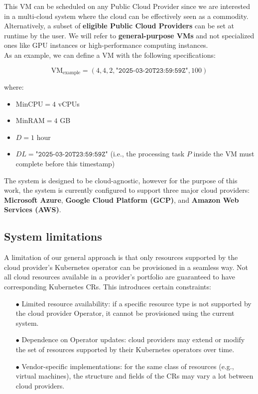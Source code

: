 This VM can be scheduled on any Public Cloud Provider since we are interested in a multi-cloud system where the cloud can be effectively seen as a commodity. 
Alternatively, a subset of \textbf{eligible Public Cloud Providers} can be set at runtime by the user.
We will refer to \textbf{general-purpose VMs} and not specialized ones like GPU instances or high-performance computing instances. \\

As an example, we can define a VM with the following specifications:

\[
\text{VM}_{\text{example}} = (4, 4, 2, \texttt{"2025-03-20T23:59:59Z"}, 100)
\]


where:
\begin{itemize}[itemsep=0.2pt, topsep=1pt]
    \item \( \text{MinCPU} = 4 \) vCPUs
    \item \( \text{MinRAM} = 4 \) GB
    \item \( D = 1 \) hour
    \item \( DL = \texttt{"2025-03-20T23:59:59Z"} \) (i.e., the processing task \( P \) inside the VM must complete before this timestamp) \\
\end{itemize}

The system is designed to be cloud-agnostic, however for the purpose of this work, the system is currently configured to support three major cloud providers: \textbf{Microsoft Azure}, \textbf{Google Cloud Platform (GCP)}, and \textbf{Amazon Web Services (AWS)}.

\subsection{System limitations}

A limitation of our general approach is that only resources supported by the cloud provider’s Kubernetes operator can be provisioned in a 
seamless way.
Not all cloud resources available in a provider’s portfolio are guaranteed to have corresponding Kubernetes CRs. 
This introduces certain constraints:

\begin{itemize}[itemsep=0.2pt, topsep=1pt]
  \item[$\bullet$] Limited resource availability: if a specific resource type is not supported by the cloud provider Operator, it cannot be provisioned using the current system.
  \item[$\bullet$] Dependence on Operator updates: cloud providers may extend or modify the set of resources supported by their Kubernetes operators over time.
  \item[$\bullet$] Vendor-specific implementations: for the same class of resources (e.g., virtual machines), the structure and fields of the CRs may vary a lot between cloud providers.
\end{itemize}

